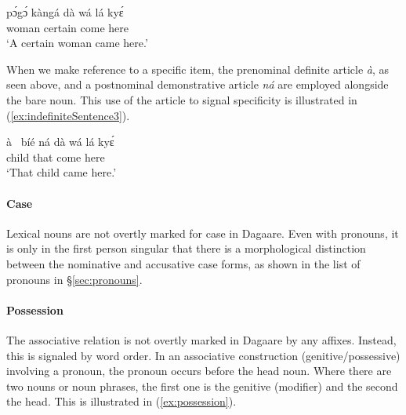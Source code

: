 \ea\label{ex:indefiniteSentence2}\gll pɔ́gɔ́ kàngá dà wá lá kyɛ́\\
woman certain {\PST} come {\FOC} here\\
\glt ‘A certain woman came here.’\z 



When we make reference to a specific item, the prenominal definite article \textit{à}, as seen
above, and a postnominal demonstrative article \textit{ná} are employed alongside the bare noun.
This use of the article to signal specificity is illustrated in (\ref{ex:indefiniteSentence3}).

\ea\label{ex:indefiniteSentence3}\gll à~ bíé ná dà wá lá kyɛ́\\
{\DEF} child that {\PST} come {\FOC} here\\
\glt ‘That child came here.’\z

\paragraph{Case}
Lexical nouns are not overtly marked for case in Dagaare. Even with pronouns, it is only in the first person singular that there is a morphological distinction between the nominative and accusative case forms, as shown in the list of pronouns in \S \ref{sec:pronouns}.

\paragraph{Possession}
The  associative relation is not overtly marked in Dagaare by any affixes. Instead, this is signaled by word order. In an associative construction (genitive/possessive) involving a pronoun, the pronoun occurs before the head noun. Where there are two nouns or noun phrases, the first one is the genitive (modifier) and the second the head. This is illustrated in (\ref{ex:possession}).

\ea \label{ex:possession}
\z \z 


